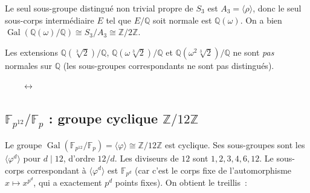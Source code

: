 \documentclass[12pt,a4paper,openany]{book}
\theoremstyle{definition}
\newcommand{\Z}{\mathbb{Z}}
\newcommand{\Q}{\mathbb{Q}}
\newcommand{\F}{\mathbb{F}}
\newcommand{\Gal}{\operatorname{Gal}}
\begin{document}
Le seul sous-groupe distingué non trivial propre de $S_3$ est
$A_3 = \langle\rho\rangle$, donc le seul sous-corps intermédiaire
$E$ tel que $E/\Q$ soit normale est $\Q(\omega)$. On a bien
$\Gal(\Q(\omega)/\Q) \cong S_3/A_3 \cong \Z/2\Z$.

Les extensions $\Q(\sqrt[3]{2})/\Q$, $\Q(\omega\sqrt[3]{2})/\Q$ et
$\Q(\omega^2\sqrt[3]{2})/\Q$ ne sont \emph{pas} normales sur $\Q$ (les
sous-groupes correspondants ne sont pas distingués).

\begin{center}
$\qquad\longleftrightarrow\qquad$
\end{center}

\subsection{$\F_{p^{12}}/\F_p$ : groupe cyclique $\Z/12\Z$}\label{ssec:Fp12}

Le groupe $\Gal(\F_{p^{12}}/\F_p) = \langle\varphi\rangle \cong \Z/12\Z$
est cyclique. Ses sous-groupes sont les $\langle\varphi^d\rangle$ pour
$d \mid 12$, d'ordre $12/d$. Les diviseurs de $12$ sont
$1, 2, 3, 4, 6, 12$. Le sous-corps correspondant à
$\langle\varphi^d\rangle$ est $\F_{p^d}$ (car c'est le corps fixe
de l'automorphisme $x \mapsto x^{p^d}$, qui a exactement $p^d$ points
fixes). On obtient le treillis~:

\begin{center}
\end{center}
\end{document}
